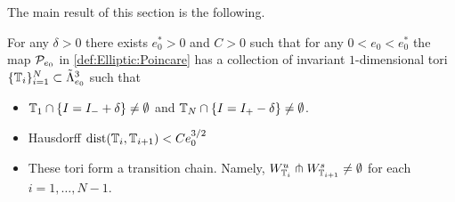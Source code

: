 The main result of this section is the following.

\begin{theorem} \label{th:Transition}
  For any $\delta>0$ there exists $e_0^*>0$ and $C>0$ such that for any $0<e_0<e_0^*$  the map $\mathcal{P}_{e_0}$ in \eqref{def:Elliptic:Poincare} has  a collection of invariant $1$-dimensional tori $\{\mathbb{T}_i\}_{i=1}^N\subset \tilde \Lambda^3_{e_0}$
  such that

  \begin{itemize}
  \item $\mathbb{T}_1\cap \{I=I_-+\delta\}\neq \emptyset$ and $\mathbb{T}_N\cap \{I=I_+-\delta\}\neq \emptyset$.

  \item Hausdorff $\mathrm{dist}(\mathbb{T}_i,\mathbb{T}_{i+1})< C e_0^{3/2}$

  \item These tori form a  transition chain. Namely,
    $ W^u_{\mathbb{T}_i}\pitchfork W^s_{\mathbb{T}_{i+1}}\neq\emptyset$ for each $i=1,\dots, N-1$.
  \end{itemize}
\end{theorem}

